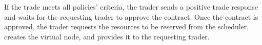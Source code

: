 If the trade meets all policies' criteria, the trader sends a positive trade
response and waits for the requesting trader to approve the contract. Once the
contract is approved, the trader requests the resources to be reserved from the
scheduler, creates the virtual node, and provides it to the requesting trader. 






%
%
%

